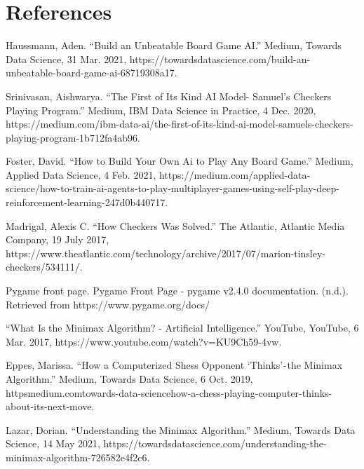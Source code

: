 \documentclass[fontsize=11pt]{article}
\begin{document}
\section*{References}

Haussmann, Aden. “Build an Unbeatable Board Game AI.” Medium, Towards Data Science, 31 Mar. 2021, https://towardsdatascience.com/build-an-unbeatable-board-game-ai-68719308a17. 


Srinivasan, Aishwarya. “The First of Its Kind AI Model- Samuel's Checkers Playing Program.” Medium, IBM Data Science in Practice, 4 Dec. 2020, https://medium.com/ibm-data-ai/the-first-of-its-kind-ai-model-samuels-checkers-playing-program-1b712fa4ab96. 


Foster, David. “How to Build Your Own Ai to Play Any Board Game.” Medium, Applied Data Science, 4 Feb. 2021, https://medium.com/applied-data-science/how-to-train-ai-agents-to-play-multiplayer-games-using-self-play-deep-reinforcement-learning-247d0b440717. 


Madrigal, Alexis C. “How Checkers Was Solved.” The Atlantic, Atlantic Media Company, 19 July 2017, https://www.theatlantic.com/technology/archive/2017/07/marion-tinsley-checkers/534111/. 

Pygame front page. Pygame Front Page - pygame v2.4.0 documentation. (n.d.). Retrieved from https://www.pygame.org/docs/ 

“What Is the Minimax Algorithm? - Artificial Intelligence.” YouTube, YouTube, 6 Mar. 2017, https://www.youtube.com/watch?v=KU9Ch59-4vw. 

Eppes, Marissa. “How a Computerized Shess Opponent ‘Thinks’ - the Minimax Algorithm.” Medium, Towards Data Science, 6 Oct. 2019, https\:\/\/medium.com\/towards-data-science\/how-a-chess-playing-computer-thinks-about-its-next-move. 

Lazar, Dorian. “Understanding the Minimax Algorithm.” Medium, Towards Data Science, 14 May 2021, https://towardsdatascience.com/understanding-the-minimax-algorithm-726582e4f2c6. 

\end{document}
